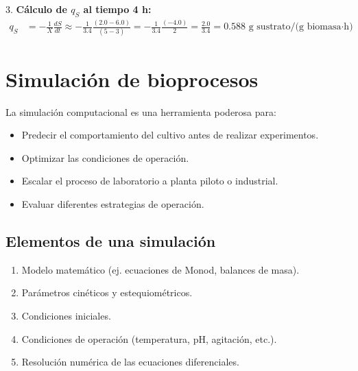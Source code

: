 3. \textbf{Cálculo de $q_S$ al tiempo 4 h:}
\begin{align*}
    q_S &= -\frac{1}{X} \frac{dS}{dt} \approx -\frac{1}{3.4} \frac{(2.0 - 6.0)}{(5 - 3)} = -\frac{1}{3.4} \frac{(-4.0)}{2} = \frac{2.0}{3.4} = 0.588 \text{ g sustrato/(g biomasa·h)}
\end{align*}

\section{Simulación de bioprocesos}

La simulación computacional es una herramienta poderosa para:
\begin{itemize}
    \item Predecir el comportamiento del cultivo antes de realizar experimentos.
    \item Optimizar las condiciones de operación.
    \item Escalar el proceso de laboratorio a planta piloto o industrial.
    \item Evaluar diferentes estrategias de operación.
\end{itemize}


\subsection{Elementos de una simulación}
\begin{enumerate}
    \item Modelo matemático (ej. ecuaciones de Monod, balances de masa).
    \item Parámetros cinéticos y estequiométricos.
    \item Condiciones iniciales.
    \item Condiciones de operación (temperatura, pH, agitación, etc.).
    \item Resolución numérica de las ecuaciones diferenciales.
\end{enumerate}